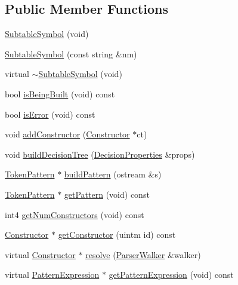 \subsection*{Public Member Functions}
\begin{DoxyCompactItemize}
\item 
\mbox{\hyperlink{class_subtable_symbol_aadf83cfad03a172a63b09d2f3056d890}{Subtable\+Symbol}} (void)
\item 
\mbox{\hyperlink{class_subtable_symbol_a8fa634ec34377a831f5a8708ab667192}{Subtable\+Symbol}} (const string \&nm)
\item 
virtual \mbox{\hyperlink{class_subtable_symbol_a9a5d482610a3dc3a3d1cf12e4b1caec3}{$\sim$\+Subtable\+Symbol}} (void)
\item 
bool \mbox{\hyperlink{class_subtable_symbol_a450730a12be8f17b67c32d4dce1b7638}{is\+Being\+Built}} (void) const
\item 
bool \mbox{\hyperlink{class_subtable_symbol_a275e20fff6be4489a1ffdb30770e85cd}{is\+Error}} (void) const
\item 
void \mbox{\hyperlink{class_subtable_symbol_aad4e50c5bc9f1f80c3e8077557568778}{add\+Constructor}} (\mbox{\hyperlink{class_constructor}{Constructor}} $\ast$ct)
\item 
void \mbox{\hyperlink{class_subtable_symbol_a35fa0a80443d8ca5f269c0fc31523625}{build\+Decision\+Tree}} (\mbox{\hyperlink{class_decision_properties}{Decision\+Properties}} \&props)
\item 
\mbox{\hyperlink{class_token_pattern}{Token\+Pattern}} $\ast$ \mbox{\hyperlink{class_subtable_symbol_a065893cefe01e3f9ae6310535c593bde}{build\+Pattern}} (ostream \&s)
\item 
\mbox{\hyperlink{class_token_pattern}{Token\+Pattern}} $\ast$ \mbox{\hyperlink{class_subtable_symbol_a131d57e0a974bd170fa21fe64c3bc4b0}{get\+Pattern}} (void) const
\item 
int4 \mbox{\hyperlink{class_subtable_symbol_a0890d79234a82b73714a3a5657e9730f}{get\+Num\+Constructors}} (void) const
\item 
\mbox{\hyperlink{class_constructor}{Constructor}} $\ast$ \mbox{\hyperlink{class_subtable_symbol_aace2d4dcb93073aa935086357bee4033}{get\+Constructor}} (uintm id) const
\item 
virtual \mbox{\hyperlink{class_constructor}{Constructor}} $\ast$ \mbox{\hyperlink{class_subtable_symbol_aeb4624a84c6ef3e18f8de1c43687373d}{resolve}} (\mbox{\hyperlink{class_parser_walker}{Parser\+Walker}} \&walker)
\item 
virtual \mbox{\hyperlink{class_pattern_expression}{Pattern\+Expression}} $\ast$ \mbox{\hyperlink{class_subtable_symbol_a103ecc93b2b3fe1a5db3edef893a4d5b}{get\+Pattern\+Expression}} (void) const

\end{DoxyCompactItemize}
